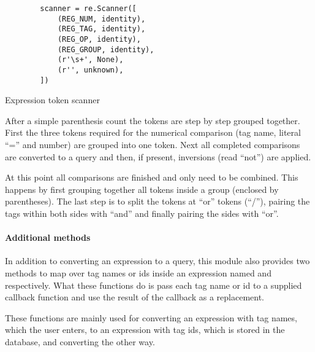 \begin{listing}[H]
    \begin{verbatim}
        scanner = re.Scanner([
            (REG_NUM, identity),
            (REG_TAG, identity),
            (REG_OP, identity),
            (REG_GROUP, identity),
            (r'\s+', None),
            (r'', unknown),
        ])
    \end{verbatim}
    \caption{Expression token scanner}
\end{listing}

After a simple parenthesis count the tokens are step by step grouped together.
First the three tokens required for the numerical comparison (tag name, literal
``='' and number) are grouped into one token. Next all completed comparisons
are converted to a query and then, if present, inversions (read ``not'') are
applied.

At this point all comparisons are finished and only need to be combined. This
happens by first grouping together all tokens inside a group (enclosed by
parentheses). The last step is to split the tokens at ``or'' tokens (``/''),
pairing the tags within both sides with ``and'' and finally pairing the sides
with ``or''.

\paragraph{Additional methods}

In addition to converting an expression to a query, this module also provides
two methods to map over tag names or ids inside an expression named
 and  respectively. What these
functions do is pass each tag name or id to a supplied callback function and
use the result of the callback as a replacement.

These functions are mainly used for converting an expression with tag names,
which the user enters, to an expression with tag ids, which is stored in the
database, and converting the other way.
